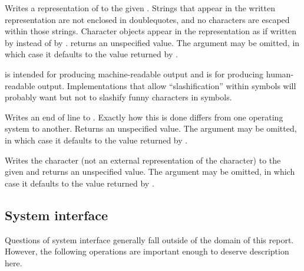 \begin{entry}{%
}

Writes a representation of  to the given .  Strings
that appear in the written representation are not enclosed in
doublequotes, and no characters are escaped within those strings.  Character
objects appear in the representation as if written by 
instead of by .   returns an unspecified value.
The  argument may be omitted, in which case it defaults to the
value returned by .

\begin{rationale}
 is intended
for producing mach\-ine-readable output and  is for producing
human-readable output.  Implementations that allow ``slashification''
within symbols will probably want  but not  to
slashify funny characters in symbols.
\end{rationale}
\end{entry}


\begin{entry}{%
}

Writes an end of line to .  Exactly how this is done differs
from one operating system to another.  Returns an unspecified value.
The  argument may be omitted, in which case it defaults to the
value returned by .

\end{entry}


\begin{entry}{%
}

Writes the character  (not an external representation of the
character) to the given  and returns an unspecified value.  The
 argument may be omitted, in which case it defaults to the value
returned by .

\end{entry}


\subsection{System interface}

Questions of system interface generally fall outside of the domain of this
report.  However, the following operations are important enough to
deserve description here.


